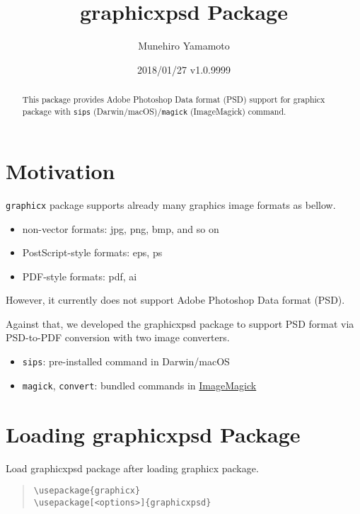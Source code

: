 \documentclass[luatex]{article}
\title{\textsf{graphicxpsd} Package}
\author{Munehiro Yamamoto}
\date{2018/01/27 v1.0.9999}
\begin{document}
\maketitle
\begin{abstract}
This package provides Adobe Photoshop Data format (PSD) support 
for \textsf{graphicx} package
with \texttt{sips} (Darwin/macOS)/\texttt{magick} (ImageMagick) command.
\end{abstract}

\section{Motivation}
\texttt{graphicx} package supports already many graphics image formats as bellow. 
\begin{itemize}
\item non-vector formats: jpg, png, bmp, and so on
\item PostScript-style formats: eps, ps
\item PDF-style formats: pdf, ai
\end{itemize}
However, it currently does not support Adobe Photoshop Data format (PSD). 

Against that, we developed the \textsf{graphicxpsd} package 
to support PSD format via PSD-to-PDF conversion 
with two image converters.
\begin{itemize}
\item \texttt{sips}: 
pre-installed command in Darwin/macOS

\item \texttt{magick}, \texttt{convert}: 
bundled commands in \href{https://www.imagemagick.org/}{ImageMagick}
\end{itemize}

\section{Loading \textsf{graphicxpsd} Package}

Load \textsf{graphicxpsd} package after loading \textsf{graphicx} package.

\begin{quote}
\begin{verbatim}
\usepackage{graphicx}
\usepackage[<options>]{graphicxpsd}
\end{verbatim}
\end{quote}
\end{document}
